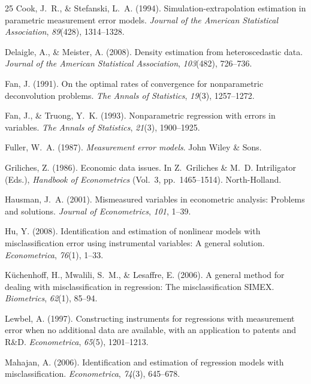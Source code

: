 \begin{thebibliography}{25}
Cook, J.~R., \& Stefanski, L.~A. (1994). Simulation-extrapolation
estimation in parametric measurement error models. \emph{Journal of
the American Statistical Association}, \emph{89}(428), 1314--1328.

Delaigle, A., \& Meister, A. (2008). Density estimation from
heteroscedastic data. \emph{Journal of the American Statistical
Association}, \emph{103}(482), 726--736.

Fan, J. (1991). On the optimal rates of convergence for nonparametric
deconvolution problems. \emph{The Annals of Statistics}, \emph{19}(3),
1257--1272.

Fan, J., \& Truong, Y.~K. (1993). Nonparametric regression with errors
in variables. \emph{The Annals of Statistics}, \emph{21}(3),
1900--1925.

Fuller, W.~A. (1987). \emph{Measurement error models}. John Wiley \&
Sons.

Griliches, Z. (1986). Economic data issues. In Z.~Griliches \&
M.~D. Intriligator (Eds.), \emph{Handbook of Econometrics} (Vol.~3,
pp.~1465--1514). North-Holland. %

Hausman, J.~A. (2001). Mismeasured variables in econometric analysis:
Problems and solutions. \emph{Journal of Econometrics}, \emph{101},
1--39. %

Hu, Y. (2008). Identification and estimation of nonlinear models with
misclassification error using instrumental variables: A general
solution. \emph{Econometrica}, \emph{76}(1), 1--33. %

K\"uchenhoff, H., Mwalili, S.~M., \& Lesaffre, E. (2006). A general
method for dealing with misclassification in regression: The
misclassification SIMEX. \emph{Biometrics}, \emph{62}(1), 85--94.

Lewbel, A. (1997). Constructing instruments for regressions with
measurement error when no additional data are available, with an
application to patents and R\&D. \emph{Econometrica}, \emph{65}(5),
1201--1213.

Mahajan, A. (2006). Identification and estimation of regression models
with misclassification. \emph{Econometrica}, \emph{74}(3), 645--678.


\end{thebibliography}
